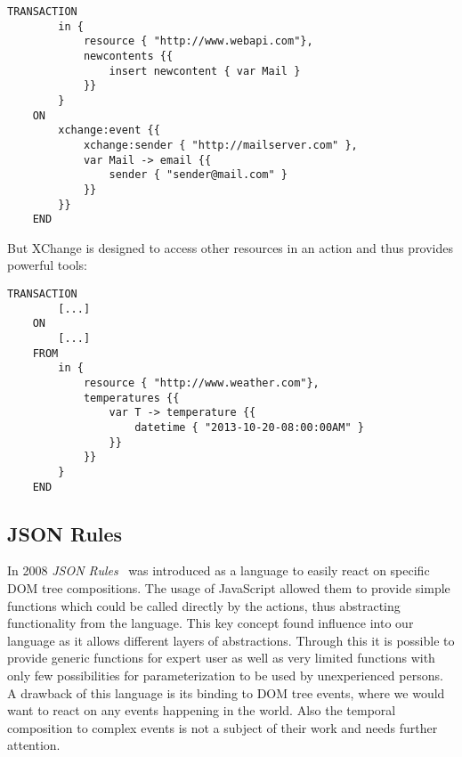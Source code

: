 \begin{lstlisting}[frame=single,float=h,label=lstxchange1,language=XChange,caption=E-Mail Example rule expressed in XChange]
	TRANSACTION
		in {
			resource { "http://www.webapi.com"},
			newcontents {{
				insert newcontent { var Mail }
			}}
		}
	ON
		xchange:event {{
			xchange:sender { "http://mailserver.com" },
			var Mail -> email {{
				sender { "sender@mail.com" }
			}}
		}}
	END
\end{lstlisting}

But XChange is designed to access other resources in an action and thus provides powerful tools:

\begin{lstlisting}[frame=single,float=h,label=lstxchange2,language=XChange,caption=XChange Rule accesses remote resource]
	TRANSACTION
		[...]
	ON
		[...]
	FROM
		in {
			resource { "http://www.weather.com"},
			temperatures {{
				var T -> temperature {{
					datetime { "2013-10-20-08:00:00AM" }
				}}
			}}
		}
	END
\end{lstlisting}

\subsection{JSON Rules}
In 2008 \emph{JSON Rules}~\cite{2008-Giurca_Pascalau-JSON_Rules.pdf} was introduced as a language to easily react on specific DOM tree compositions.
The usage of JavaScript allowed them to provide simple functions which could be called directly by the actions, thus abstracting functionality from the language.
This key concept found influence into our language as it allows different layers of abstractions.
Through this it is possible to provide generic functions for expert user as well as very limited functions with only few possibilities for parameterization to be used by unexperienced persons.
A drawback of this language is its binding to DOM tree events, where we would want to react on any events happening in the world.
Also the temporal composition to complex events is not a subject of their work and needs further attention.


